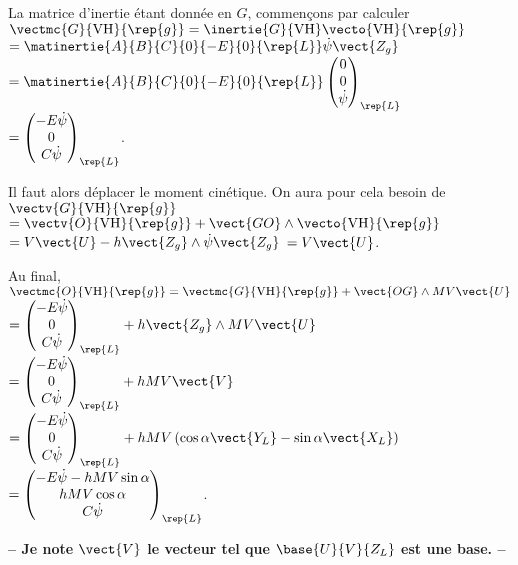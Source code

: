 \ifprof
\begin{corrige}

La matrice d'inertie étant donnée en $G$, commençons par calculer 
$\vectmc{G}{\text{VH}}{\rep{g}} = \inertie{G}{\text{VH}} \vecto{\text{VH}}{\rep{g}} $
$ =\matinertie{A}{B}{C}{0}{-E}{0}{\rep{L}} \dot{\psi}\vect{Z_g} $
$ =\matinertie{A}{B}{C}{0}{-E}{0}{\rep{L}} \begin{pmatrix} 0 \\ 0 \\ \dot{\psi} \end{pmatrix}_{\rep{L}} $
$ =  \begin{pmatrix} -E\dot{\psi} \\ 0 \\ C\dot{\psi} \end{pmatrix}_{\rep{L}} $.

Il faut alors déplacer le moment cinétique. On aura pour cela besoin de $\vectv{G}{\text{VH}}{\rep{g}} $
$= \vectv{O}{\text{VH}}{\rep{g}} + \vect{GO}\wedge  \vecto{\text{VH}}{\rep{g}}$
$ = V\vect{U}-h\vect{Z_g} \wedge  \dot{\psi}\vect{Z_g} $
$ = V\vect{U}$.

Au final, 
$\vectmc{O}{\text{VH}}{\rep{g}} =\vectmc{G}{\text{VH}}{\rep{g}} +\vect{OG}\wedge MV\vect{U}$
$ = \begin{pmatrix} -E\dot{\psi} \\ 0 \\ C\dot{\psi} \end{pmatrix}_{\rep{L}} + h\vect{Z_g} \wedge MV\vect{U}$ 
$ = \begin{pmatrix} -E\dot{\psi} \\ 0 \\ C\dot{\psi} \end{pmatrix}_{\rep{L}} + hMV\vect{V}$ 
$ = \begin{pmatrix} -E\dot{\psi} \\ 0 \\ C\dot{\psi} \end{pmatrix}_{\rep{L}} + hMV\left(\cos\alpha \vect{Y_L} - \sin\alpha \vect{X_L} \right)$ 
$ = \begin{pmatrix} -E\dot{\psi} - hMV \sin\alpha \\ hMV\cos\alpha \\ C\dot{\psi} \end{pmatrix}_{\rep{L}} $.

\textbf{ -- Je note $\vect{V}$ le vecteur tel que $\base{U}{V}{Z_L}$ est une base. --}
\end{corrige}
\else
\fi

